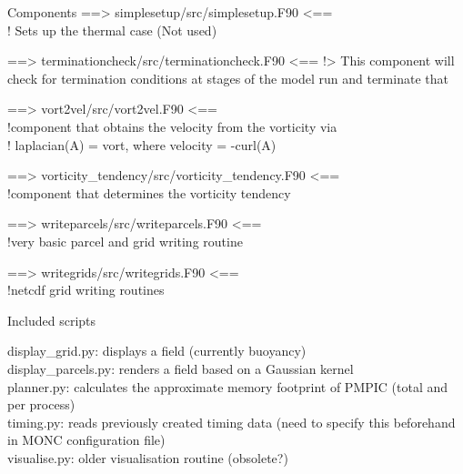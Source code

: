 \documentclass{beamer}
\begin{document}
\begin{frame}{Components}
==\textgreater{} simplesetup/src/simplesetup.F90 \textless{}==\\
! Sets up the thermal case (Not used)

==\textgreater{} terminationcheck/src/terminationcheck.F90 \textless{}==
!\textgreater{} This component will check for termination conditions at
stages of the model run and terminate that

==\textgreater{} vort2vel/src/vort2vel.F90 \textless{}==\\
!component that obtains the velocity from the vorticity via\\
! laplacian(A) = vort, where velocity = -curl(A)

==\textgreater{} vorticity\_tendency/src/vorticity\_tendency.F90
\textless{}==\\
!component that determines the vorticity tendency

==\textgreater{} writeparcels/src/writeparcels.F90 \textless{}==\\
!very basic parcel and grid writing routine

==\textgreater{} writegrids/src/writegrids.F90 \textless{}==\\
!netcdf grid writing routines

\end{frame}

\begin{frame}{Included scripts}
\protect\hypertarget{included-scripts}{}

display\_grid.py: displays a field (currently buoyancy)\\
display\_parcels.py: renders a field based on a Gaussian kernel\\
planner.py: calculates the approximate memory footprint of PMPIC (total
and per process)\\
timing.py: reads previously created timing data (need to specify this
beforehand in MONC configuration file)\\
visualise.py: older visualisation routine (obsolete?)

\end{frame}
\end{document}
